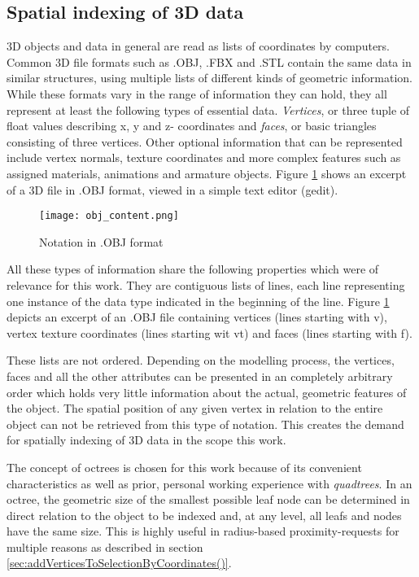 		\subsection{Spatial indexing of 3D data}
		\label{sec:impl_spatial_indexing_3d}
3D objects and data in general are read as lists of coordinates by computers. Common 3D file formats such as .OBJ, .FBX and .STL contain the same data in similar structures, using multiple lists of different kinds of geometric information. While these formats vary in the range of information they can hold, they all represent at least the following types of essential data. \textit{Vertices}, or three tuple of float values describing x, y and z- coordinates and \textit{faces}, or basic triangles consisting of three vertices. Other optional information that can be represented include vertex normals, texture coordinates and more complex features such as assigned materials, animations and armature objects. Figure \ref{fig:obj_content} shows an excerpt of a 3D file in .OBJ format, viewed in a simple text editor (gedit).

\begin{figure}[htb]
  \centering
  \texttt{[image: obj\_content.png]}\\ %
  \caption{Notation in .OBJ format}\label{fig:obj_content}
\end{figure}

All these types of information share the following properties which were of relevance for this work. They are contiguous lists of lines, each line representing one instance of the data type indicated in the beginning of the line. Figure \ref{fig:obj_content} depicts an excerpt of an .OBJ file containing vertices (lines starting with v), vertex texture coordinates (lines starting wit vt) and faces (lines starting with f).

These lists are not ordered. Depending on the modelling process, the vertices, faces and all the other attributes can be presented in an completely arbitrary order which holds very little information about the actual, geometric features of the object. The spatial position of any given vertex in relation to the entire object can not be retrieved from this type of notation. This creates the demand for spatially indexing of 3D data in the scope this work.

The concept of octrees \cite{Octree} is chosen for this work because of its convenient characteristics as well as prior, personal working experience with \textit{quadtrees}. In an octree, the geometric size of the smallest possible leaf node can be determined in direct relation to the object to be indexed and, at any level, all leafs and nodes have the same size. This is highly useful in radius-based proximity-requests for multiple reasons as described in section \ref{sec:addVerticesToSelectionByCoordinates()}.

